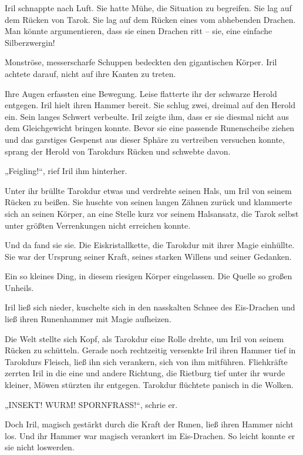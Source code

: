 Iril schnappte nach Luft. Sie hatte Mühe, die Situation zu begreifen. Sie lag auf dem Rücken von Tarok. Sie lag auf dem Rücken eines vom abhebenden Drachen. Man könnte argumentieren, dass sie einen Drachen ritt – sie, eine einfache Silberzwergin!

Monströse, messerscharfe Schuppen bedeckten den gigantischen Körper. Iril achtete darauf, nicht auf ihre Kanten zu treten.

Ihre Augen erfassten eine Bewegung. Leise flatterte ihr der schwarze Herold entgegen. Iril hielt ihren Hammer bereit. Sie schlug zwei, dreimal auf den Herold ein. Sein langes Schwert verbeulte. Iril zeigte ihm, dass er sie diesmal nicht aus dem Gleichgewicht bringen konnte. Bevor sie eine passende Runenscheibe ziehen und das garstiges Gespenst aus dieser Sphäre zu vertreiben versuchen konnte, sprang der Herold von Tarokdurs Rücken und schwebte davon.

„Feigling!“, rief Iril ihm hinterher.

Unter ihr brüllte Tarokdur etwas und verdrehte seinen Hals, um Iril von seinem Rücken zu beißen. Sie huschte von seinen langen Zähnen zurück und klammerte sich an seinen Körper, an eine Stelle kurz vor seinem Halsansatz, die Tarok selbst unter größten Verrenkungen nicht erreichen konnte.

Und da fand sie sie. Die Eiskristallkette, die Tarokdur mit ihrer Magie einhüllte. Sie war der Ursprung seiner Kraft, seines starken Willens und seiner Gedanken.

Ein so kleines Ding, in diesem riesigen Körper eingelassen. Die Quelle so großen Unheils.

Iril ließ sich nieder, kuschelte sich in den nasskalten Schnee des Eis-Drachen und ließ ihren Runenhammer mit Magie aufheizen.

Die Welt stellte sich Kopf, als Tarokdur eine Rolle drehte, um Iril von seinem Rücken zu schütteln. Gerade noch rechtzeitig versenkte Iril ihren Hammer tief in Tarokdurs Fleisch, ließ ihn sich verankern, sich von ihm mitführen. Fliehkräfte zerrten Iril in die eine und andere Richtung, die Rietburg tief unter ihr wurde kleiner, Möwen stürzten ihr entgegen. Tarokdur flüchtete panisch in die Wolken.

„INSEKT! WURM! SPORNFRASS!“, schrie er.

Doch Iril, magisch gestärkt durch die Kraft der Runen, ließ ihren Hammer nicht los. Und ihr Hammer war magisch verankert im Eis-Drachen. So leicht konnte er sie nicht loswerden.


